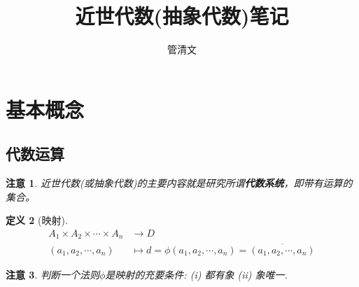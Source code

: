 \documentclass[UTF8]{ctexart}
\newtheorem{Definition}{\hspace{2em}定义}%
\newtheorem{Remark}[Definition]{\hspace{2em}注意}
\begin{document}
\title{近世代数(抽象代数)笔记}
\author{管清文}
\maketitle
\tableofcontents

\section{基本概念}

\subsection{代数运算}

\begin{Remark}
近世代数(或抽象代数)的主要内容就是研究所谓\textbf{代数系统}，即带有运算的集合。
\end{Remark}

\begin{Definition}[映射]
$$ \begin{aligned}
A_1 \times A_2 \times \cdots \times A_n &\rightarrow D \\
 (a_1, a_2, \cdots, a_n) &\mapsto d = \phi (a_1, a_2, \cdots, a_n) = \overline{(a_1, a_2, \cdots, a_n)} \end{aligned}$$ 
\end{Definition}

\begin{Remark}
 		判断一个法则$\phi$是映射的充要条件: (i) 都有象 (ii) 象唯一.
\end{Remark}
\end{document}
